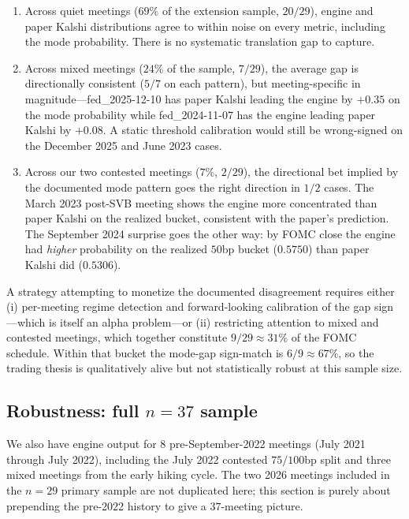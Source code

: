 \documentclass[11pt]{article}
\begin{document}
\begin{enumerate}[itemsep=0pt,topsep=0pt]
\item Across quiet meetings ($69\%$ of the extension sample, $20/29$),
engine and paper Kalshi distributions agree to within noise on every
metric, including the mode probability. There is no systematic
translation gap to capture.
\item Across mixed meetings ($24\%$ of the sample, $7/29$), the
average gap is directionally consistent ($5/7$ on each pattern), but
meeting-specific in magnitude---fed\_2025-12-10 has paper Kalshi
leading the engine by $+0.35$ on the mode probability while
fed\_2024-11-07 has the engine leading paper Kalshi by $+0.08$. A
static threshold calibration would still be wrong-signed on the
December 2025 and June 2023 cases.
\item Across our two contested meetings ($7\%$, $2/29$), the
directional bet implied by the documented mode pattern goes the
right direction in $1/2$ cases. The March 2023 post-SVB meeting
shows the engine more concentrated than paper Kalshi on the
realized bucket, consistent with the paper's prediction. The
September 2024 surprise goes the other way: by FOMC close the
engine had \emph{higher} probability on the realized $50$bp bucket
($0.5750$) than paper Kalshi did ($0.5306$).
\end{enumerate}

A strategy attempting to monetize the documented disagreement
requires either (i) per-meeting regime detection and forward-looking
calibration of the gap sign---which is itself an alpha problem---or
(ii) restricting attention to mixed and contested meetings, which
together constitute $9/29 \approx 31\%$ of the FOMC schedule. Within
that bucket the mode-gap sign-match is $6/9 \approx 67\%$, so the
trading thesis is qualitatively alive but not statistically robust at
this sample size.

\subsection{Robustness: full $n=37$ sample}\label{sec:robustness}

We also have engine output for $8$ pre-September-2022 meetings
(July 2021 through July 2022), including the July 2022 contested
$75/100$bp split and three mixed meetings from the early hiking
cycle. The two 2026 meetings included in the $n=29$ primary sample
are not duplicated here; this section is purely about prepending the
pre-2022 history to give a $37$-meeting picture.
\end{document}
